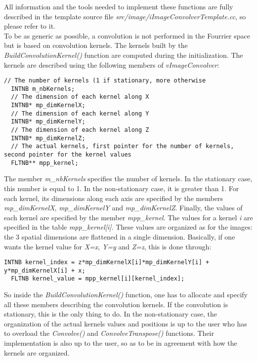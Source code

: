 \documentclass[a4paper, 11pt]{article}
\begin{document}
All information and the tools needed to implement these functions are fully described in the template source file \textit{src/image/iImageConvolverTemplate.cc}, so please
refer to it.\\

To be as generic as possible, a convolution is not performed in the Fourrier space but is based on convolution kernels. The kernels built by the \textit{BuildConvolutionKernel()}
function are computed during the initialization. The kernels are described using the following members of \textit{vImageConvolver}:

\begin{lstlisting}[label={Kernel members},caption=Variables members of vImageConvolver describing the convolution kernels.]
  // The number of kernels (1 if stationary, more otherwise
  INTNB m_nbKernels;
  // The dimension of each kernel along X
  INTNB* mp_dimKernelX;
  // The dimension of each kernel along Y
  INTNB* mp_dimKernelY;
  // The dimension of each kernel along Z
  INTNB* mp_dimKernelZ;
  // The actual kernels, first pointer for the number of kernels, second pointer for the kernel values
  FLTNB** mpp_kernel;
\end{lstlisting}

The member \textit{m\_nbKernels} specifies the number of kernels. In the stationary case, this number is equal to 1. In the non-stationary case, it is greater than 1. For each kernel, its dimensions
along each axis are specified by the members \textit{mp\_dimKernelX}, \textit{mp\_dimKernelY} and \textit{mp\_dimKernelZ}. Finally, the values of each kernel are specified by the member
\textit{mpp\_kernel}. The values for a kernel \textit{i} are specified in the table \textit{mpp\_kernel[i]}. These values are organized as for the images: the 3 spatial dimensions are
flattened in a single dimension. Basically, if one wants the kernel value for \textit{X=x}, \textit{Y=y} and \textit{Z=z}, this is done through:

\begin{lstlisting}[label={3D},caption={How to access kernel value for X=x, Y=y and Z=z of kernel i}]
  INTNB kernel_index = z*mp_dimKernelX[i]*mp_dimKernelY[i] + y*mp_dimKernelX[i] + x;
  FLTNB kernel_value = mpp_kernel[i][kernel_index];
\end{lstlisting}

So inside the \textit{BuildConvolutionKernel()} function, one has to allocate and specify all these members describing the convolution kernels. If the convolution is stationary, this
is the only thing to do. In the non-stationary case, the organization of the actual kernels values and positions is up to the user who has to overload the
\textit{Convolve()} and \textit{ConvolveTranspose()} functions. Their implementation is also up to the user, so as to be in agreement with how the kernels are organized.\\
\end{document}
